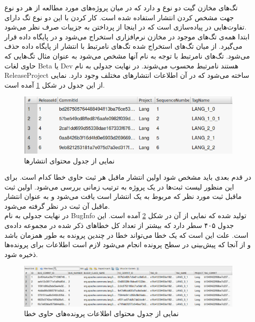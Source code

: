 تگ‌های مخازن گیت دو نوع  و   دارد که در میان پروژه‌های مورد مطالعه از هر دو نوع جهت مشخص کردن انتشار استفاده شده است.  کار کردن با این دو نوع تگ دارای تفاوت‌هایی در پیاده‌سازی است که در اینجا از پرداختن به جزییات صرف نظر می‌شود. \\ ابتدا همه‌ی تگ‌های موجود در مخازن نرم‌افزاری استخراج می‌شود و در پایگاه داده قرار می‌گیرد. از میان تگ‌های استخراج شده تگ‌های نامرتبط با انتشار از پایگاه داده حذف می‌شود. تگ‌های نامرتبط با توجه به نام آنها مشخص می‌شود به عنوان مثال تگ‌هایی که حاوی لغات Beta یا Dev هستند نامرتبط  محسوب می‌شوند. در نهایت جدولی به نام ReleaseProject ساخته می‌شود که در آن اطلاعات انتشارهای مختلف وجود دارد. نمایی از این جدول در شکل \ref{fig:project-release} آمده است. \\
\begin{figure}[H]
	\centering
	\includegraphics[width=1\textwidth]{img/case_study/project-release.png}
	\caption{نمایی از جدول محتوای انتشارها}
	\label{fig:project-release}
\end{figure}


در قدم بعدی باید مشخص شود اولین انتشار ماقبل هر ثبت حاوی خطا کدام است. برای این منظور لیست ثبت‌ها  در یک پروژه به ترتیب زمانی بررسی می‌شود. اولین ثبت  ماقبل ثبت مورد نظر که مربوط به یک انتشار است یافت می‌شود و به عنوان انتشار ماقبل آن ثبت در نظر گرفته می‌شود. \\

 در نهایت جدولی به نام BugInfo تولید شده که نمایی از آن در شکل \ref{fig:bug-info} آمده است. این جدول ۴۰۵ سطر دارد که بیشتر از تعداد کل خطاهای ذکر شده در مجموعه داده‌ی  است. علت این است که یک خطا می‌تواند خطا در چندین پرونده به طور همزمان باشد و از آنجا که پیش‌بینی در سطح پرونده انجام می‌شود لازم است اطلاعات برای پرونده‌ها ذخیره شود.

\begin{figure}[H]
\centering
\includegraphics[width=1\textwidth]{img/case_study/bug-info.png}
\caption{نمایی از جدول محتوای اطلاعات پرونده‌های حاوی خطا}
\label{fig:bug-info}
\end{figure}

